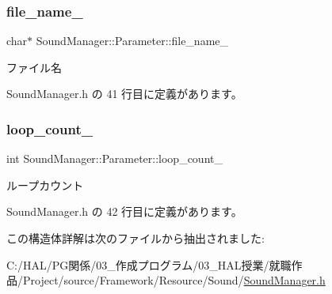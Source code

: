\subsubsection{\texorpdfstring{file\+\_\+name\+\_\+}{file\_name\_}}
{\footnotesize\ttfamily char$\ast$ Sound\+Manager\+::\+Parameter\+::file\+\_\+name\+\_\+}



ファイル名 



 Sound\+Manager.\+h の 41 行目に定義があります。

\mbox{\label{struct_sound_manager_1_1_parameter_a7bb2608cdf81aabd6a53466bae11cc33}} 
\subsubsection{\texorpdfstring{loop\+\_\+count\+\_\+}{loop\_count\_}}
{\footnotesize\ttfamily int Sound\+Manager\+::\+Parameter\+::loop\+\_\+count\+\_\+}



ループカウント 



 Sound\+Manager.\+h の 42 行目に定義があります。



この構造体詳解は次のファイルから抽出されました\+:\begin{DoxyCompactItemize}
\item 
C\+:/\+H\+A\+L/\+P\+G関係/03\+\_\+作成プログラム/03\+\_\+\+H\+A\+L授業/就職作品/\+Project/source/\+Framework/\+Resource/\+Sound/\mbox{\hyperlink{_sound_manager_8h}{Sound\+Manager.\+h}}\end{DoxyCompactItemize}
